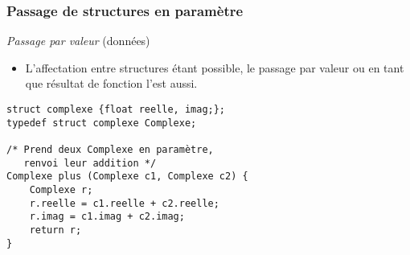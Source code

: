 \documentclass[table,handout,tikz,12pt,svgnames]{beamer}
\begin{document}
\begin{frame}[fragile=singleslide]
	\frametitle{Passage de structures en paramètre}
	\vspace{-0.7cm}
	\begin{itemize}
	\vspace{.3cm}	
	\end{itemize}
				\begin{verbatim}
struct complexe {float reelle, imag;};
typedef struct complexe Complexe;

/* Prend deux Complexe en paramètre,
   renvoi leur addition */
Complexe plus (Complexe c1, Complexe c2) {
	Complexe r;
	r.reelle = c1.reelle + c2.reelle; 
	r.imag = c1.imag + c2.imag;
	return r;
}
				\end{verbatim}				
\end{frame}
\end{document}
